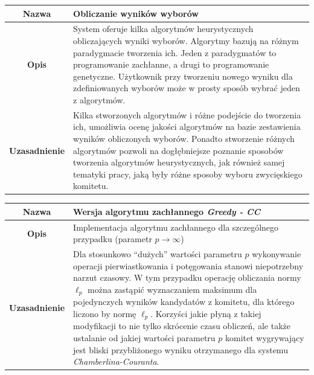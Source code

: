\documentclass[polish,11pt]{aghthesis}
\begin{document}
\begin{center}
\begin{tabular}{|c|p{10cm}|}
\hline
\textbf{Nazwa} & Obliczanie wyników wyborów \\ 
\hline 
\textbf{Opis} & System oferuje kilka algorytmów heurystycznych obliczających wyniki
wyborów. Algorytmy bazują na różnym paradygmacie tworzenia ich.
Jeden z paradygmatów to programowanie zachłanne, a drugi to
programowanie genetyczne. Użytkownik przy tworzeniu
nowego wyniku dla zdefiniowanych wyborów może w prosty sposób
wybrać jeden z algorytmów. \\ 
\hline 
\textbf{Uzasadnienie} & Kilka stworzonych algorytmów i różne podejście do tworzenia ich,
umożliwia ocenę jakości algorytmów na bazie zestawienia wyników
obliczonych wyborów. Ponadto stworzenie różnych algorytmów pozwoli
na dogłębniejsze poznanie sposobów tworzenia algorytmów
heurystycznych, jak również samej tematyki pracy, jaką były różne
sposoby wyboru zwycięskiego komitetu.\\ 
\hline 
\end{tabular}
\end{center}

\vspace{\baselineskip}

\begin{center}
\begin{tabular}{|c|p{10cm}|}
\hline
\textbf{Nazwa} & Wersja algorytmu zachłannego \textit{Greedy - CC} \\ 
\hline 
\textbf{Opis} & Implementacja algorytmu zachłannego dla szczególnego przypadku
(parametr $p \to \infty$) \\ 
\hline 
\textbf{Uzasadnienie} & Dla stosunkowo ``dużych'' wartości parametru $p$ wykonywanie operacji
pierwiastkowania i potęgowania stanowi niepotrzebny narzut czasowy.
W tym przypadku operację obliczania normy $\ell_p$ można zastąpić
wyznaczaniem maksimum dla pojedynczych wyników kandydatów z
komitetu, dla którego liczono by normę $\ell_p$.
Korzyści jakie płyną z takiej modyfikacji to nie tylko skrócenie czasu
obliczeń, ale także ustalanie od jakiej wartości parametru $p$ komitet
wygrywający jest bliski przybliżonego wyniku otrzymanego dla systemu
\textit{Chamberlina-Couranta}.\\ 
\hline 
\end{tabular} 
\end{center}
\newpage
\end{document}
